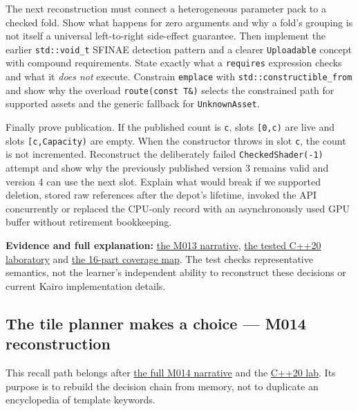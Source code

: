 The next reconstruction must connect a heterogeneous parameter pack to a checked fold. Show what happens for zero arguments and why a fold's grouping is not itself a universal left-to-right side-effect guarantee. Then implement the earlier \texttt{std::void\_t} SFINAE detection pattern and a clearer \texttt{Uploadable} concept with compound requirements. State exactly what a \texttt{requires} expression checks and what it \emph{does not} execute. Constrain \texttt{emplace} with \texttt{std::constructible\_from} and show why the overload \texttt{route(const\ T\&)} selects the constrained path for supported assets and the generic fallback for \texttt{UnknownAsset}.

Finally prove publication. If the published count is \texttt{c}, slots \texttt{{[}0,c)} are live and slots \texttt{{[}c,Capacity)} are empty. When the constructor throws in slot \texttt{c}, the count is not incremented. Reconstruct the deliberately failed \texttt{CheckedShader(-1)} attempt and show why the previously published version 3 remains valid and version 4 can use the next slot. Explain what would break if we supported deletion, stored raw references after the depot's lifetime, invoked the API concurrently or replaced the CPU-only record with an asynchronously used GPU buffer without retirement bookkeeping.

\textbf{Evidence and full explanation:} \href{Continuous\%20Notes/Computing\%20Foundations\%20-\%20From\%20Bits\%20to\%20C++\%20and\%20Systems\%20APIs\#One\%20asset\%20pipeline,\%20many\%20asset\%20types\%20—\%20generic\%20code\%20without\%20accidental\%20promises}{the M013 narrative}, \href{tools/labs/generic_asset_pipeline_lab.cpp}{the tested C++20 laboratory} and \hyperref[appendix-fd090d982a15]{the 16-part coverage map}. The test checks representative semantics, not the learner's independent ability to reconstruct these decisions or current Kairo implementation details.

\subsection{The tile planner makes a choice --- M014 reconstruction}\label{the-tile-planner-makes-a-choice-m014-reconstruction}

This recall path belongs after \href{Continuous\%20Notes/Computing\%20Foundations\%20-\%20From\%20Bits\%20to\%20C++\%20and\%20Systems\%20APIs\#A\%20texture\%20tile\%20that\%20chooses\%20its\%20work\%20before\%20the\%20frame\%20begins}{the full M014 narrative} and the \href{tools/labs/compile_time_asset_policy_lab.cpp}{C++20 lab}. Its purpose is to rebuild the decision chain from memory, not to duplicate an encyclopedia of template keywords.

